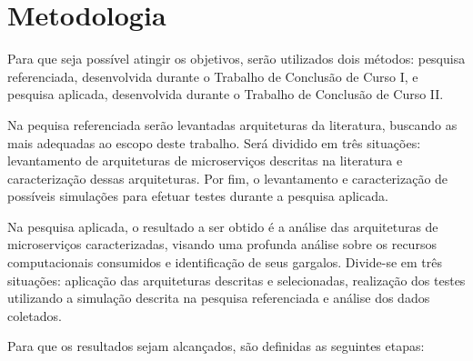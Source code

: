 \section{Metodologia}
\label{met}

Para que seja poss\'{i}vel atingir os objetivos, serão utilizados dois métodos: pesquisa referenciada, desenvolvida durante o Trabalho de Conclusão de Curso I, e pesquisa aplicada, desenvolvida durante o Trabalho de Conclusão de Curso II.

Na pequisa referenciada serão levantadas arquiteturas da literatura, buscando as mais adequadas ao escopo deste trabalho. Será dividido em três situações: levantamento de arquiteturas de microserviços descritas na literatura e caracterização dessas arquiteturas. Por fim, o levantamento e caracterização de possíveis simulações para efetuar testes durante a pesquisa aplicada.

Na pesquisa aplicada, o resultado a ser obtido é a análise das arquiteturas de microserviços caracterizadas, visando uma profunda análise sobre os recursos computacionais consumidos e identificação de seus gargalos. Divide-se em três situações: aplicação das arquiteturas descritas e selecionadas, realização dos testes utilizando a simulação descrita na pesquisa referenciada e análise dos dados coletados.

Para que os resultados sejam alcançados, são definidas as seguintes etapas:

